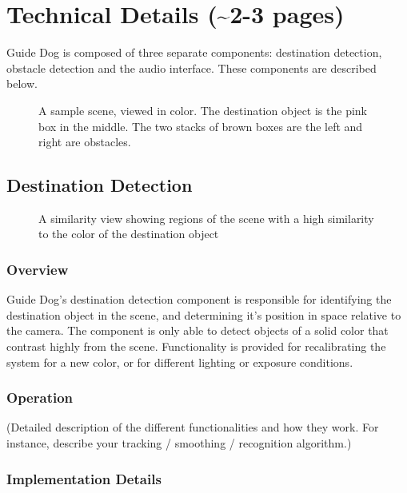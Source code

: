 \section{Technical Details (\textasciitilde 2-3 pages)}
\label{sec:technical}

Guide Dog is composed of three separate components: destination detection,
obstacle detection and the audio interface. These components are described
below.

\begin{figure}
\caption{A sample scene, viewed in color. The destination object is the pink box
  in the middle. The two stacks of brown boxes are the left and right are
  obstacles.}
\label{fig:color}
\end{figure}

\subsection{Destination Detection}
\label{sec:dest}

\begin{figure}
\caption{A similarity view showing regions of the scene with a high similarity
to the color of the destination object}
\label{fig:destination}
\end{figure}

\subsubsection{Overview}
\label{sec:dest-overview}

Guide Dog's destination detection component is responsible for identifying the
destination object in the scene, and determining it's position in space 
relative to the camera. The component is only able to detect objects of a solid
color that contrast highly from the scene. Functionality is provided for
recalibrating the system for a new color, or for different lighting or
exposure conditions. 

\subsubsection{Operation}
\label{sec:dest-op}

(Detailed description of the different functionalities and how they work. For
instance, describe your tracking / smoothing / recognition algorithm.)

\subsubsection{Implementation Details}
\label{sec:dest-impl}

